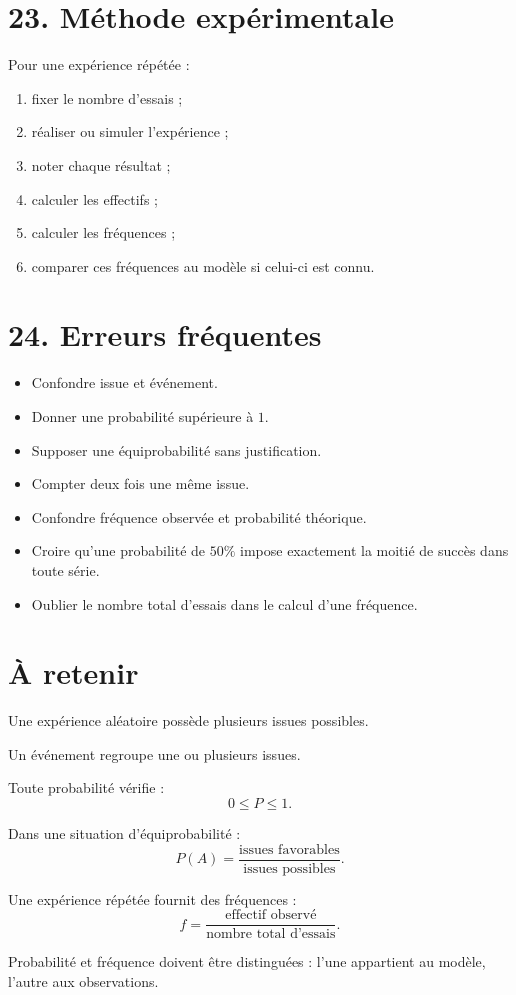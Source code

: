 \section{23. Méthode expérimentale}

\begin{methode}
Pour une expérience répétée :
\begin{enumerate}
\item fixer le nombre d'essais ;
\item réaliser ou simuler l'expérience ;
\item noter chaque résultat ;
\item calculer les effectifs ;
\item calculer les fréquences ;
\item comparer ces fréquences au modèle si celui-ci est connu.
\end{enumerate}
\end{methode}

\section{24. Erreurs fréquentes}

\begin{itemize}
\item Confondre issue et événement.
\item Donner une probabilité supérieure à $1$.
\item Supposer une équiprobabilité sans justification.
\item Compter deux fois une même issue.
\item Confondre fréquence observée et probabilité théorique.
\item Croire qu'une probabilité de $50\%$ impose exactement la moitié de succès dans toute série.
\item Oublier le nombre total d'essais dans le calcul d'une fréquence.
\end{itemize}

\section{À retenir}

\begin{aretenir}
Une expérience aléatoire possède plusieurs issues possibles.

Un événement regroupe une ou plusieurs issues.

Toute probabilité vérifie :
\[
\boxed{0\le P\le1}.
\]

Dans une situation d'équiprobabilité :
\[
\boxed{
P(A)=
\dfrac{\text{issues favorables}}{\text{issues possibles}}
}.
\]

Une expérience répétée fournit des fréquences :
\[
\boxed{
f=
\dfrac{\text{effectif observé}}{\text{nombre total d'essais}}
}.
\]

Probabilité et fréquence doivent être distinguées : l'une appartient au modèle, l'autre aux observations.
\end{aretenir}
